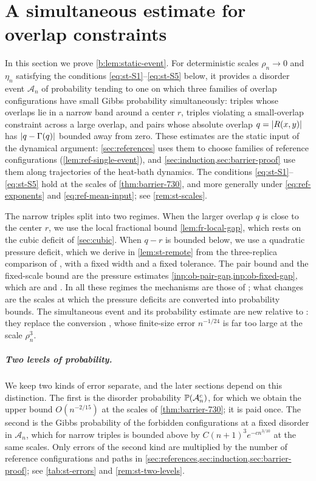 \chapter{A simultaneous estimate for overlap constraints}\label{sec:static}

In this section we prove \cref{b:lem:static-event}. For deterministic scales $\rho_n\to0$ and $\eta_n$ satisfying the conditions \eqref{eq:st-S1}--\eqref{eq:st-S5} below, it provides a disorder event $\mathcal A_n$ of probability tending to one on which three families of overlap configurations have small Gibbs probability simultaneously: triples whose overlaps lie in a narrow band around a center $r$, triples violating a small-overlap constraint across a large overlap, and pairs whose absolute overlap $q=\lvert R(x,y)\rvert$ has $\lvert q-\Gamma(q)\rvert$ bounded away from zero. These estimates are the static input of the dynamical argument: \cref{sec:references} uses them to choose families of reference configurations (\cref{lem:ref-single-event}), and \cref{sec:induction,sec:barrier-proof} use them along trajectories of the heat-bath dynamics. The conditions \eqref{eq:st-S1}--\eqref{eq:st-S5} hold at the scales of \cref{thm:barrier-730}, and more generally under \eqref{eq:ref-exponents} and \eqref{eq:ref-mean-input}; see \cref{rem:st-scales}.

The narrow triples split into two regimes. When the larger overlap $q$ is close to the center $r$, we use the local fractional bound \cref{lem:fr-local-gap}, which rests on the cubic deficit of \cref{sec:cubic}. When $q-r$ is bounded below, we use a quadratic pressure deficit, which we derive in \cref{lem:st-remote} from the three-replica comparison of \cite[Section~7]{oai-barriers}, with a fixed width and a fixed tolerance. The pair bound and the fixed-scale bound are the pressure estimates \cref{inp:ob-pair-gap,inp:ob-fixed-gap}, which are \cite[Lemma~4.3]{oai-barriers} and \cite[(4.20)]{oai-barriers}. In all these regimes the mechanisms are those of \cite{oai-barriers}; what changes are the scales at which the pressure deficits are converted into probability bounds. The simultaneous event and its probability estimate are new relative to \cite{oai-barriers}: they replace the conversion \cite[Lemma~4.2]{oai-barriers}, whose finite-size error $n^{-1/24}$ is far too large at the scale $\rho_n^3$.

\paragraph{Two levels of probability.} We keep two kinds of error separate, and the later sections depend on this distinction. The first is the disorder probability $\mathbb P(\mathcal A_n^c)$, for which we obtain the upper bound $O(n^{-2/15})$ at the scales of \cref{thm:barrier-730}; it is paid once. The second is the Gibbs probability of the forbidden configurations at a fixed disorder in $\mathcal A_n$, which for narrow triples is bounded above by $C(n+1)^3e^{-cn^{3/10}}$ at the same scales. Only errors of the second kind are multiplied by the number of reference configurations and paths in \cref{sec:references,sec:induction,sec:barrier-proof}; see \cref{tab:st-errors} and \cref{rem:st-two-levels}.

